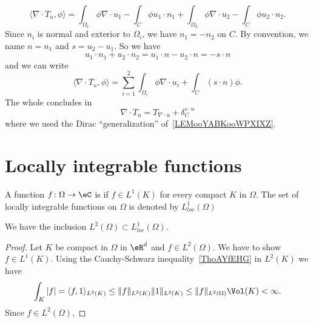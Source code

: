 \begin{equation}
	\langle \nabla\cdot T_u, \phi\rangle =\int_{\Omega_1}\phi\nabla\cdot u_1-\int_C\phi u_1\cdot n_1+\int_{\Omega_2}\phi\nabla\cdot u_2-\int_C\phi u_2\cdot n_2.
\end{equation}
Since \( n_i\) is normal and exterior to \( \Omega_i\), we have \( n_1=-n_2\) on \( C\). By convention, we name \( n=n_1\) and \( s=u_2-u_1\). So we have
\begin{equation}
	u_1\cdot n_1+u_2\cdot n_2=u_1\cdot n-u_2\cdot n=-s\cdot n
\end{equation}
and we can write
\begin{equation}
	\langle \nabla\cdot T_u, \phi\rangle =\sum_{i=1}^2\int_{\Omega_i}\phi\nabla\cdot u_i+\int_C(s\cdot n)\phi.
\end{equation}
The whole concludes in
\begin{equation}
	\nabla\cdot T_u=T_{\nabla\cdot u}+\delta_C^{s\cdot n}
\end{equation}
where we used the Dirac ``generalization'' of~\ref{LEMooYABKooWPXIXZ}.

\section{Locally integrable functions}

\begin{definition}
	A function \( f\colon \Omega\to \eC\) is  if \( f\in L^1(K)\) for every compact \( K\) in \( \Omega\). The set of locally integrable functions on \( \Omega\) is denoted by \( L^1_{loc}(\Omega)\)
\end{definition}

\begin{proposition}
	We have the inclusion \( L^2(\Omega)\subset L^1_{loc}(\Omega)\).
\end{proposition}

\begin{proof}
	Let \( K\) be compact in \( \Omega\) in \( \eR^d\) and \( f\in L^2(\Omega)\). We have to show \( f\in L^1(K)\). Using the Cauchy-Schwarz inequality~\ref{ThoAYfEHG} in \( L^2(K)\) we have
	\begin{equation}
		\int_K| f |=\langle f, 1\rangle_{L^2(K)} \leq \| f \|_{L^2(K)}\| 1 \|_{L^2(K)}\leq \| f \|_{L^2(\Omega)}\Vol(K)<\infty.
	\end{equation}
	Since \( f\in L^2(\Omega)\),
\end{proof}

